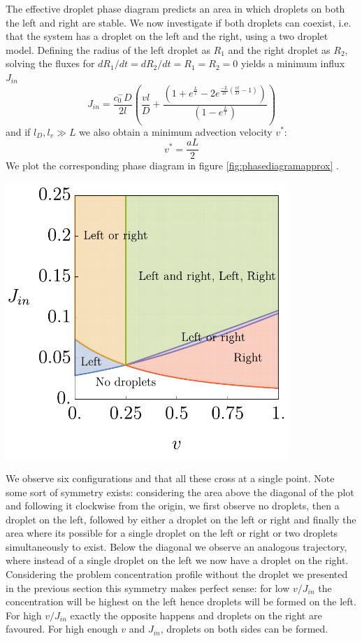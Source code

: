 \documentclass{Dissertate}
\let\origfigure\figure
\let\endorigfigure\endfigure
\renewenvironment{figure}[1][2] {
    \expandafter\origfigure\expandafter[H]
} {
    \endorigfigure
}
\begin{document}
The effective droplet phase diagram predicts an area in which
droplets on both the left and right are stable. We now investigate if
both droplets can coexist, i.e. that the system has a droplet on the
left and the right, using a two droplet model. Defining the radius of the left droplet as $R_1$ and the right droplet as $R_2$, solving the fluxes
for \(dR_1/dt=dR_2/dt=R_1=R_2=0\) yields a minimum influx \(J_{in}\) \[
J_{in} = \frac{c_0^-D}{2l}\left(\frac{vl}{D}+\frac{(1+e^{\frac{L}{l}}-2e^{\frac{-L}{2l}(\frac{vl}{D}-1)})}{(1-e^{\frac{L}{l}})}\right)
\] and if \(l_D,l_v\gg L\) we also obtain a minimum advection velocity
\(v^*\): \begin{equation}
v^*=\frac{aL}{2}
\label{eq:minadv}\end{equation} We plot the corresponding phase diagram
in figure \ref{fig:phasediagramapprox} .

\begin{figure}
\hypertarget{fig:phasediagramapprox}{%
\centering
\includegraphics[width=0.8\textwidth]{source/figures/pdf/phaseapprox.pdf}
\caption{Analytically derived phase diagram of droplets on the edges of the system.}\label{fig:phasediagramapprox}
}
\end{figure}

We observe six configurations and that all these cross at a single point. Note
some sort of symmetry exists: considering the area above the diagonal of
the plot and following it clockwise from the origin, we first observe no
droplets, then a droplet on the left, followed by either a droplet on
the left or right and finally the area where its possible for a single
droplet on the left or right or two droplets simultaneously to exist. Below the
diagonal we observe an analogous trajectory, where instead of a single
droplet on the left we now have a droplet on the right. Considering the
problem concentration profile without the droplet we presented in the previous section this symmetry makes
perfect sense: for low \(v/J_{in}\) the concentration will be highest on
the left hence droplets will be formed on the left. For high
\(v/J_{in}\) exactly the opposite happens and droplets on the right are
favoured. For high enough $v$ and $J_{in}$, droplets on both sides can be formed.
\end{document}
